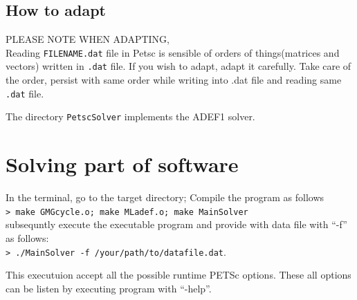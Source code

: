\documentclass[a4paper,11pt]{article}
\begin{document}
\subsection{How to adapt}
PLEASE NOTE WHEN ADAPTING, \\
Reading \texttt{FILENAME.dat} file in Petsc is sensible of orders of
things(matrices and vectors) 
written in \texttt{.dat} file. If you wish to adapt, adapt it carefully. Take
care of the order, persist with same order while writing into .dat file and
reading same \texttt{.dat} file. \\
\par
The directory \texttt{PetscSolver} implements the ADEF1 solver.
\section{Solving part of software}
In the terminal, go to the target directory; Compile the program as follows\\

\texttt{> make GMGcycle.o; make MLadef.o; make MainSolver} \\

subsequntly execute the executable program and provide with data file with
``-f'' as follows: \\

\texttt{> ./MainSolver -f /your/path/to/datafile.dat}.\\ 
\par
This executuion accept all the possible runtime PETSc options. These all
options can be listen by executing program with ``-help''.
 



%
\end{document}
